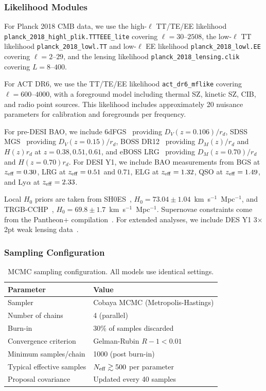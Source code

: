 \documentclass[a4paper,11pt]{article}
\begin{document}
\subsubsection{Likelihood Modules}

For Planck 2018 CMB data, we use the high-$\ell$ TT/TE/EE likelihood \texttt{planck\_2018\_highl\_plik.TTTEEE\_lite} covering $\ell = 30$--$2508$, the low-$\ell$ TT likelihood \texttt{planck\_2018\_lowl.TT} and low-$\ell$ EE likelihood \texttt{planck\_2018\_lowl.EE} covering $\ell = 2$--$29$, and the lensing likelihood \texttt{planck\_2018\_lensing.clik} covering $L = 8$--$400$.

For ACT DR6, we use the TT/TE/EE likelihood \texttt{act\_dr6\_mflike} covering $\ell = 600$--$4000$, with a foreground model including thermal SZ, kinetic SZ, CIB, and radio point sources. This likelihood includes approximately 20 nuisance parameters for calibration and foregrounds per frequency.

For pre-DESI BAO, we include 6dFGS~\cite{6dFGS} providing $D_V(z=0.106)/r_d$, SDSS MGS~\cite{MGS} providing $D_V(z=0.15)/r_d$, BOSS DR12~\cite{BOSS_DR12} providing $D_M(z)/r_d$ and $H(z)r_d$ at $z = 0.38, 0.51, 0.61$, and eBOSS LRG~\cite{eBOSS} providing $D_M(z=0.70)/r_d$ and $H(z=0.70)r_d$. For DESI Y1, we include BAO measurements from BGS at $z_{\rm eff} = 0.30$, LRG at $z_{\rm eff} = 0.51$ and $0.71$, ELG at $z_{\rm eff} = 1.32$, QSO at $z_{\rm eff} = 1.49$, and Ly$\alpha$ at $z_{\rm eff} = 2.33$.

Local $H_0$ priors are taken from SH0ES~\cite{SH0ES}, $H_0 = 73.04 \pm 1.04$~km~s$^{-1}$~Mpc$^{-1}$, and TRGB-CCHP~\cite{Freedman2024}, $H_0 = 69.8 \pm 1.7$~km~s$^{-1}$~Mpc$^{-1}$. Supernovae constraints come from the Pantheon+ compilation~\cite{Pantheon}. For extended analyses, we include DES Y1 3$\times$2pt weak lensing data~\cite{DES_Y1}.

\subsubsection{Sampling Configuration}

\begin{table}[ht]
\centering
\caption{MCMC sampling configuration. All models use identical settings.}
\label{tab:sampling}
\begin{tabular}{ll}
\toprule
\textbf{Parameter} & \textbf{Value} \\
\midrule
Sampler & Cobaya MCMC (Metropolis-Hastings) \\
Number of chains & 4 (parallel) \\
Burn-in & 30\% of samples discarded \\
Convergence criterion & Gelman-Rubin $R - 1 < 0.01$ \\
Minimum samples/chain & 1000 (post burn-in) \\
Typical effective samples & $N_{\rm eff} \gtrsim 500$ per parameter \\
Proposal covariance & Updated every 40 samples \\
\bottomrule
\end{tabular}
\end{table}
\end{document}
